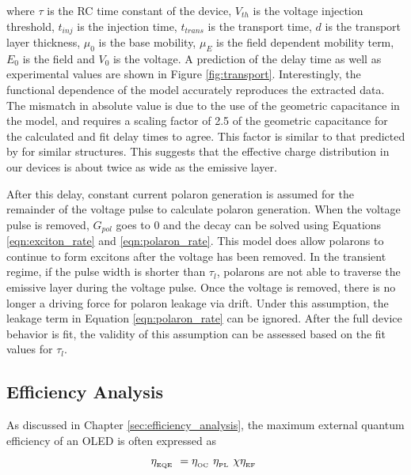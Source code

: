 \documentclass[../thesis.tex]{subfiles}
\begin{document}
where $\tau$ is the RC time constant of the device, $V_{th}$ is the voltage injection threshold, $t_{inj}$ is the injection time, $t_{trans}$ is the transport time, $d$ is the transport layer thickness, $\mu_0$ is the base mobility, $\mu_E$ is the field dependent mobility term, $E_0$ is the field and $V_0$ is the voltage.
A prediction of the delay time as well as experimental values are shown in Figure \ref{fig:transport}.
Interestingly, the functional dependence of the model accurately reproduces the extracted data.
The mismatch in absolute value is due to the use of the geometric capacitance in the model, and requires a scaling factor of 2.5 of the geometric capacitance for the calculated and fit delay times to agree.  This factor is similar to that predicted by \textcite{Liu2012d} for similar structures.
This suggests that the effective charge distribution in our devices is about twice as wide as the emissive layer.


After this delay, constant current polaron generation is assumed for the remainder of the voltage pulse to calculate polaron generation.  
When the voltage pulse is removed, $G_{pol}$ goes to 0 and the decay can be solved using Equations \ref{eqn:exciton_rate} and \ref{eqn:polaron_rate}.
This model does allow polarons to continue to form excitons after the voltage has been removed.
In the transient regime, if the pulse width is shorter than $\tau_l$, polarons are not able to traverse the emissive layer during the voltage pulse.  
Once the voltage is removed, there is no longer a driving force for polaron leakage via drift.
Under this assumption, the leakage term in Equation \ref{eqn:polaron_rate} can be ignored.
After the full device behavior is fit, the validity of this assumption can be assessed based on the fit values for $\tau_l$.



\subsection{Efficiency Analysis}

As discussed in Chapter \ref{sec:efficiency_analysis}, the maximum external quantum efficiency of an OLED is often expressed as\supercite{Baldo1998a,Rothberg1996}

\begin{equation}
\eta_{_\text{\tiny EQE}}\ =\eta_{_\text{\tiny OC}}\  \eta_{_\text{\tiny PL}}\  \chi \eta_{_\text{\tiny EF}}\ 
\label{eqn:eqeSimple}
\end{equation}
\end{document}
